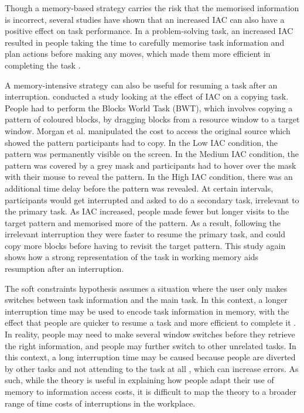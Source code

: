 Though a memory-based strategy carries the risk that the memorised information is incorrect, several studies have shown that an increased IAC can also have a positive effect on task performance. In a problem-solving task, an increased IAC resulted in people taking the time to carefully memorise task information and plan actions before making any moves, which made them more efficient in completing the task \citep[e.g.][]{Morgan2007, Morgan2012}. 

A memory-intensive strategy can also be useful for resuming a task after an interruption. \citet{Morgan2009} conducted a study looking at the effect of IAC on a copying task. People had to perform the Blocks World Task (BWT), which involves copying a pattern of coloured blocks, by dragging blocks from a resource window to a target window. Morgan et al. manipulated the cost to access the original source which showed the pattern participants had to copy. In the Low IAC condition, the pattern was permanently visible on the screen. In the Medium IAC condition, the pattern was covered by a grey mask and participants had to hover over the mask with their mouse to reveal the pattern. In the High IAC condition, there was an additional time delay before the pattern was revealed. At certain intervals, participants would get interrupted and asked to do a secondary task, irrelevant to the primary task. As IAC increased, people made fewer but longer visits to the target pattern and memorised more of the pattern. As a result, following the irrelevant interruption they were faster to resume the primary task, and could copy more blocks before having to revisit the target pattern. This study again shows how a strong representation of the task in working memory aids resumption after an interruption.

The soft constraints hypothesis assumes a situation where the user only makes switches between task information and the main task. In this context, a longer interruption time may be used to encode task information in memory, with the effect that people are quicker to resume a task and more efficient to complete it \citep{Morgan2007, Morgan2012}. In reality, people may need to make several window switches before they retrieve the right information, and people may further switch to other unrelated tasks. In this context, a long interruption time may be caused because people are diverted by other tasks and not attending to the task at all \citep{Iqbal2008}, which can increase errors. As such, while the theory is useful in explaining how people adapt their use of memory to information access costs, it is difficult to map the theory to a broader range of time costs of interruptions in the workplace. 

